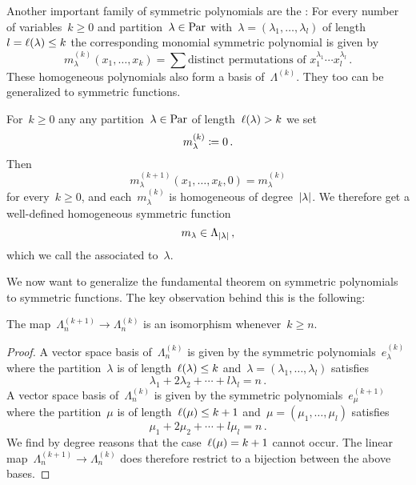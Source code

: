 \documentclass[a4paper,11pt]{scrartcl}
\begin{document}
Another important family of symmetric polynomials are the :
For every number of variables~$k \geq 0$ and partition~$\lambda \in \mathrm{Par}$ with~$\lambda = (\lambda_1, \dotsc, \lambda_l)$ of length~$l = \ell(\lambda) \leq k$ the corresponding monomial symmetric polynomial is given by
\[
  m^{(k)}_\lambda(x_1, \dotsc, x_k)
  =
  \sum \text{distinct permutations of~$x_1^{\lambda_1} \dotsm x_l^{\lambda_l}$} \,.
\]
These homogeneous polynomials also form a basis of~$\Lambda^{(k)}$.
They too can be generalized to symmetric functions.

\begin{example}
  For~$k \geq 0$ any any partition~$\lambda \in \mathrm{Par}$ of length~$\ell(\lambda) > k$ we set
  \[
    m^{(k)}_\lambda \coloneqq 0 \,.
  \]
  Then
  \[
    m^{(k+1)}_\lambda(x_1, \dotsc, x_k, 0)
    =
    m^{(k)}_\lambda
  \]
  for every~$k \geq 0$, and each~$m_\lambda^{(k)}$ is homogeneous of degree~$\lvert\lambda\rvert$.
  We therefore get a well-defined homogeneous symmetric function
  \[
    m_\lambda
    \in
    \Lambda_{\lvert\lambda\rvert} \,,
  \]
  which we call the  associated to~$\lambda$.
\end{example}

We now want to generalize the fundamental theorem on symmetric polynomials to symmetric functions.
The key observation behind this is the following:

\begin{proposition}
  \label{sequence stabilizes}
  The map~$\Lambda^{(k+1)}_n \to \Lambda^{(k)}_n$ is an isomorphism whenever~$k \geq n$. 
\end{proposition}

\begin{proof}
  A vector space basis of~$\Lambda^{(k)}_n$ is given by the symmetric polynomials~$e^{(k)}_\lambda$ where the partition~$\lambda$ is of length~$\ell(\lambda) \leq k$ and~$\lambda = (\lambda_1, \dotsc, \lambda_l)$ satisfies
  \[
    \lambda_1 + 2 \lambda_2 + \dotsb + l \lambda_l = n \,.
  \]
  A vector space basis of~$\Lambda^{(k)}_n$ is given by the symmetric polynomials~$e^{(k+1)}_\mu$ where the partition~$\mu$ is of length~$\ell(\mu) \leq k+1$ and~$\mu = (\mu_1, \dotsc, \mu_l)$ satisfies
  \[
    \mu_1 + 2 \mu_2 + \dotsb + l \mu_l = n \,.
  \]
  We find by degree reasons that the case~$\ell(\mu) = k+1$ cannot occur.
  The linear map~$\Lambda^{(k+1)}_n \to \Lambda^{(k)}_n$ does therefore restrict to a bijection between the above bases.
\end{proof}
\end{document}
